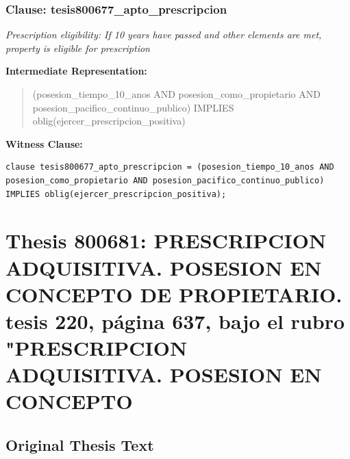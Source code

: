 \documentclass[11pt,a4paper]{article}
\begin{document}
\subsubsection{Clause: tesis800677\_apto\_prescripcion}

\textit{Prescription eligibility: If 10 years have passed and other elements are met, property is eligible for prescription}

\textbf{Intermediate Representation:}

\begin{quote}
(posesion\_tiempo\_10\_anos AND posesion\_como\_propietario AND posesion\_pacifico\_continuo\_publico) IMPLIES oblig(ejercer\_prescripcion\_positiva)
\end{quote}

\textbf{Witness Clause:}

\begin{lstlisting}[style=witnessstyle, language=Witness]
clause tesis800677_apto_prescripcion = (posesion_tiempo_10_anos AND posesion_como_propietario AND posesion_pacifico_continuo_publico) IMPLIES oblig(ejercer_prescripcion_positiva);
\end{lstlisting}

\newpage

\section{Thesis 800681: PRESCRIPCION ADQUISITIVA. POSESION EN CONCEPTO DE PROPIETARIO. tesis 220, página 637, bajo el rubro "PRESCRIPCION ADQUISITIVA. POSESION EN CONCEPTO}
\label{thesis:800681}

\subsection{Original Thesis Text}
\end{document}
